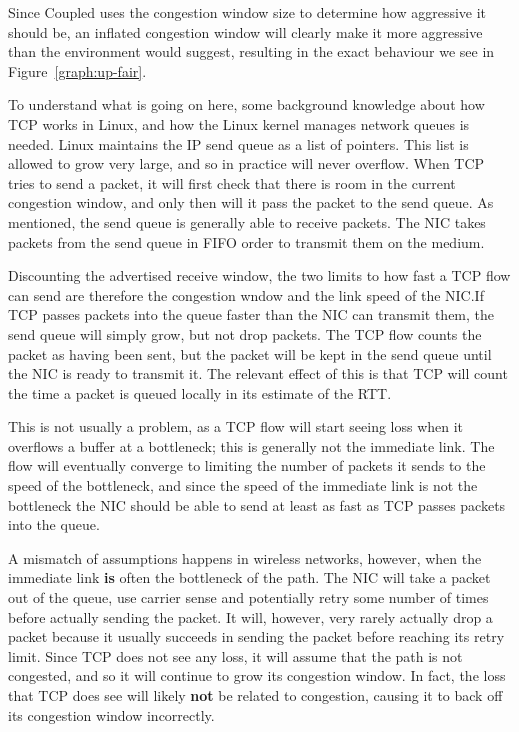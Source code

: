 Since Coupled uses the congestion window size to determine how aggressive it
should be, an inflated congestion window will clearly make it more aggressive
than the environment would suggest, resulting in the exact behaviour we see in
Figure~\ref{graph:up-fair}.

To understand what is going on here, some background knowledge about how TCP
works in Linux, and how the Linux kernel manages network queues is needed. Linux
maintains the IP send queue as a list of pointers. This list is allowed to grow
very large, and so in practice will never overflow. When TCP tries to send a
packet, it will first check that there is room in the current congestion window,
and only then will it pass the packet to the send queue. As mentioned, the send
queue is generally able to receive packets. The NIC takes packets from the send
queue in FIFO order to transmit them on the medium.

Discounting the advertised receive window, the two limits to how fast a TCP flow
can send are therefore the congestion wndow and the link speed of the NIC.\@ If
TCP passes packets into the queue faster than the NIC can transmit them, the
send queue will simply grow, but not drop packets. The TCP flow counts the
packet as having been sent, but the packet will be kept in the send queue until
the NIC is ready to transmit it. The relevant effect of this is that TCP will
count the time a packet is queued locally in its estimate of the RTT.

This is not usually a problem, as a TCP flow will start seeing loss when it
overflows a buffer at a bottleneck; this is generally not the immediate link.
The flow will eventually converge to limiting the number of packets it sends to
the speed of the bottleneck, and since the speed of the immediate link is not
the bottleneck the NIC should be able to send at least as fast as TCP passes
packets into the queue.

A mismatch of assumptions happens in wireless networks, however, when the
immediate link \textbf{is} often the bottleneck of the path. The NIC will take a
packet out of the queue, use carrier sense and potentially retry some number of
times before actually sending the packet. It will, however, very rarely actually
drop a packet because it usually succeeds in sending the packet before reaching
its retry limit. Since TCP does not see any loss, it will assume that the path
is not congested, and so it will continue to grow its congestion window.  In
fact, the loss that TCP does see will likely \textbf{not} be related to
congestion, causing it to back off its congestion window incorrectly. %

